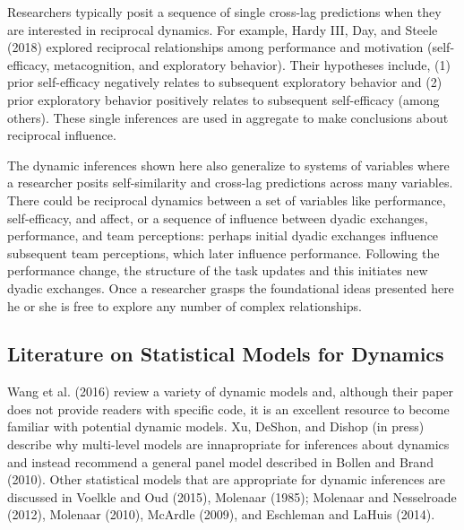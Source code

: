 \documentclass[english,,man]{apa6}
\theoremstyle{definition}
\theoremstyle{definition}
\theoremstyle{definition}
\theoremstyle{remark}
\begin{document}
Researchers typically posit a sequence of single cross-lag predictions
when they are interested in reciprocal dynamics. For example, Hardy III,
Day, and Steele (2018) explored reciprocal relationships among
performance and motivation (self-efficacy, metacognition, and
exploratory behavior). Their hypotheses include, (1) prior self-efficacy
negatively relates to subsequent exploratory behavior and (2) prior
exploratory behavior positively relates to subsequent self-efficacy
(among others). These single inferences are used in aggregate to make
conclusions about reciprocal influence.

The dynamic inferences shown here also generalize to systems of
variables where a researcher posits self-similarity and cross-lag
predictions across many variables. There could be reciprocal dynamics
between a set of variables like performance, self-efficacy, and affect,
or a sequence of influence between dyadic exchanges, performance, and
team perceptions: perhaps initial dyadic exchanges influence subsequent
team perceptions, which later influence performance. Following the
performance change, the structure of the task updates and this initiates
new dyadic exchanges. Once a researcher grasps the foundational ideas
presented here he or she is free to explore any number of complex
relationships.

\hypertarget{literature-on-statistical-models-for-dynamics}{%
\subsection{Literature on Statistical Models for
Dynamics}\label{literature-on-statistical-models-for-dynamics}}

Wang et al. (2016) review a variety of dynamic models and, although
their paper does not provide readers with specific code, it is an
excellent resource to become familiar with potential dynamic models. Xu,
DeShon, and Dishop (in press) describe why multi-level models are
innapropriate for inferences about dynamics and instead recommend a
general panel model described in Bollen and Brand (2010). Other
statistical models that are appropriate for dynamic inferences are
discussed in Voelkle and Oud (2015), Molenaar (1985); Molenaar and
Nesselroade (2012), Molenaar (2010), McArdle (2009), and Eschleman and
LaHuis (2014).
\end{document}
